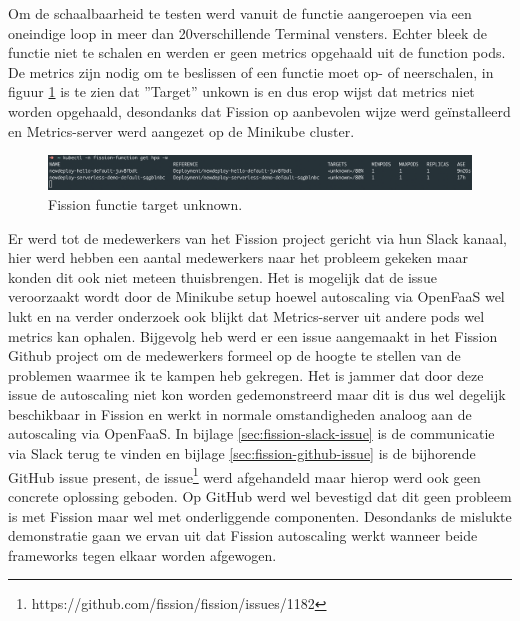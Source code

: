 Om de schaalbaarheid te testen werd vanuit de functie  aangeroepen via een oneindige loop in meer dan 20verschillende Terminal vensters. Echter bleek de functie niet te schalen en werden er geen metrics opgehaald uit de function pods. De metrics zijn nodig om te beslissen of een functie moet op- of neerschalen, in figuur \ref{fig:fission-scalability-issue} is te zien dat ''Target'' unkown is en dus erop wijst dat metrics niet worden opgehaald, desondanks dat Fission op aanbevolen wijze werd geïnstalleerd en Metrics-server werd aangezet op de Minikube cluster.
\begin{figure}
    \includegraphics[width=1\textwidth]{img/fission-scalability-issue.png}
    \caption{Fission functie target unknown.}
    \label{fig:fission-scalability-issue}  
\end{figure}

Er werd tot de medewerkers van het Fission project gericht via hun Slack kanaal, hier werd hebben een aantal medewerkers naar het probleem gekeken maar konden dit ook niet meteen thuisbrengen. Het is mogelijk dat de issue veroorzaakt wordt door de Minikube setup hoewel autoscaling via OpenFaaS wel lukt en na verder onderzoek ook blijkt dat Metrics-server uit andere pods wel metrics kan ophalen. Bijgevolg heb werd er een issue aangemaakt in het Fission Github project om de medewerkers formeel op de hoogte te stellen van de problemen waarmee ik te kampen heb gekregen. Het is jammer dat door deze issue de autoscaling niet kon worden gedemonstreerd maar dit is dus wel degelijk beschikbaar in Fission en werkt in normale omstandigheden analoog aan de autoscaling via OpenFaaS. In bijlage \ref{sec:fission-slack-issue} is de communicatie via Slack terug te vinden en bijlage \ref{sec:fission-github-issue} is de bijhorende GitHub issue present, de issue\footnote{https://github.com/fission/fission/issues/1182} werd afgehandeld maar hierop werd ook geen concrete oplossing geboden. Op GitHub werd wel bevestigd dat dit geen probleem is met Fission maar wel met onderliggende componenten. Desondanks de mislukte demonstratie gaan we ervan uit dat Fission autoscaling werkt wanneer beide frameworks tegen elkaar worden afgewogen.


